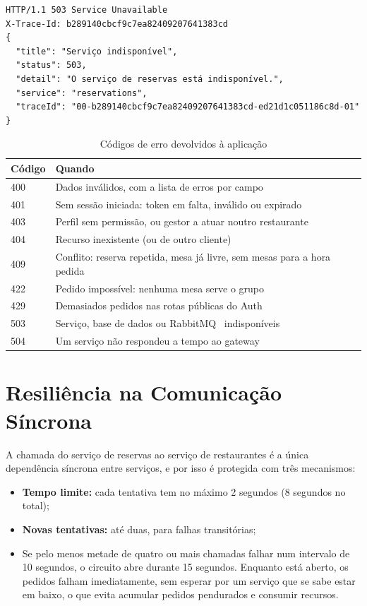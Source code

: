 \begin{verbatim}
HTTP/1.1 503 Service Unavailable
X-Trace-Id: b289140cbcf9c7ea82409207641383cd
{
  "title": "Serviço indisponível",
  "status": 503,
  "detail": "O serviço de reservas está indisponível.",
  "service": "reservations",
  "traceId": "00-b289140cbcf9c7ea82409207641383cd-ed21d1c051186c8d-01"
}
\end{verbatim}

\begin{table}[H]
\centering
\begin{tabularx}{\textwidth}{lX}
\toprule
\textbf{Código} & \textbf{Quando} \\
\midrule
400 & Dados inválidos, com a lista de erros por campo \\
401 & Sem sessão iniciada: token em falta, inválido ou expirado \\
403 & Perfil sem permissão, ou gestor a atuar noutro restaurante \\
404 & Recurso inexistente (ou de outro cliente) \\
409 & Conflito: reserva repetida, mesa já livre, sem mesas para a hora pedida \\
422 & Pedido impossível: nenhuma mesa serve o grupo \\
429 & Demasiados pedidos nas rotas públicas do Auth \\
503 & Serviço, base de dados ou RabbitMQ~\cite{rabbitmq} indisponíveis \\
504 & Um serviço não respondeu a tempo ao gateway \\
\bottomrule
\end{tabularx}
\caption{Códigos de erro devolvidos à aplicação}
\label{tab:codigos}
\end{table}

\section{Resiliência na Comunicação Síncrona}
\label{sec:resiliencia-http}

A chamada do serviço de reservas ao serviço de restaurantes é a única dependência síncrona entre
serviços, e por isso é protegida com três mecanismos:

\begin{itemize}
  \item \textbf{Tempo limite:} cada tentativa tem no máximo 2 segundos (8 segundos no total);
  \item \textbf{Novas tentativas:} até duas, para falhas transitórias;
  \item Se pelo menos metade de quatro ou mais chamadas falhar num intervalo de 10 segundos, o circuito abre durante 15 segundos. Enquanto está aberto, os pedidos falham imediatamente, sem esperar por um serviço que se sabe estar em baixo, o que evita acumular pedidos pendurados e consumir recursos.
\end{itemize}

